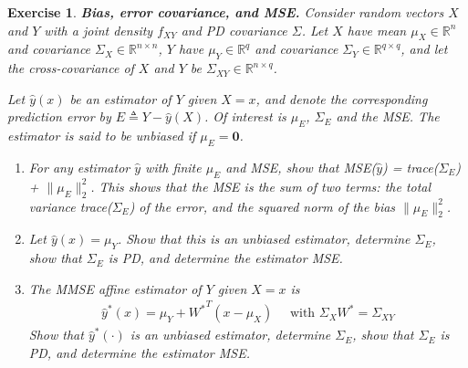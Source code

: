 \documentclass[12pt]{article}
\theoremstyle{colon}
\newtheorem{exercise}{Exercise}
\begin{document}
\begin{exercise}
  \textbf{Bias, error covariance, and MSE.} Consider random vectors $X$ and $Y$ with a joint density $f_{XY}$ and PD covariance $\Sigma$. Let $X$ have mean $\mu_X \in \mathbb{R}^n$ and covariance $\Sigma_X \in \mathbb{R}^{n \times n}$, $Y$ have $\mu_Y \in \mathbb{R}^q$ and covariance $\Sigma_Y \in \mathbb{R}^{q \times q}$, and let the cross-covariance of $X$ and $Y$ be $\Sigma_{XY} \in \mathbb{R}^{n \times q}$.

  Let $\hat{y}(x)$ be an estimator of $Y$ given $X = x$, and denote the corresponding prediction error by $E \triangleq Y - \hat{y}(X)$. Of interest is $\mu_E$, $\Sigma_E$ and the MSE. The estimator is said to be \textit{unbiased} if $\mu_E = \bm{0}$.

  \begin{enumerate}[label=\alph*)]
    \item For any estimator $\hat{y}$ with finite $\mu_E$ and MSE, show that MSE($\hat{y}$) = trace($\Sigma_E$) + $\lVert \mu_E \rVert_2^2$. This shows that the MSE is the sum of two terms: the total variance trace($\Sigma_E$) of the error, and the squared norm of the bias $\lVert \mu_E \rVert_2^2$.

    \item Let $\hat{y}(x) = \mu_Y$. Show that this is an unbiased estimator, determine $\Sigma_E$, show that $\Sigma_E$ is PD, and determine the estimator MSE.

    \item The MMSE affine estimator of $Y$ given $X = x$ is
      \begin{gather*}
        \hat{y}^*(x) = \mu_Y + {W^*}^T (x - \mu_X) \quad \text{ with } \Sigma_X W^* = \Sigma_{XY}
      \end{gather*}
      Show that $\hat{y}^*(\cdot)$ is an unbiased estimator, determine $\Sigma_E$, show that $\Sigma_E$ is PD, and determine the estimator MSE.
  \end{enumerate}
\end{exercise}
\end{document}

